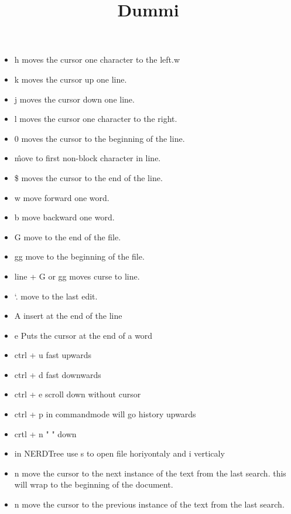 \documentclass[12pt]{article}
\title{Dummi}
\begin{document}
\setlength{\parindent}{0pt}
\setlength{\parskip}{30pt}
\setlength{\baselineskip}{20pt}




\begin{itemize}

    \item h moves the cursor one character to the left.w
    \item k moves the cursor up one line.
    \item j moves the cursor down one line.
    \item l moves the cursor one character to the right.
    \item 0 moves the cursor to the beginning of the line.
    \item \^ move to first non-block character in line. 
    \item \$ moves the cursor to the end of the line.
    \item w move forward one word.
    \item b move backward one word.
    \item G move to the end of the file.
    \item gg move to the beginning of the file.
    \item line + G or gg moves curse to line.
    \item `. move to the last edit.
    \item A insert at the end of the line
    \item e  Puts the cursor at the end of a word
    \item ctrl + u  fast upwards
    \item ctrl + d  fast downwards
    \item ctrl + e  scroll down without cursor
    \item ctrl + p in commandmode will go history upwards
    \item crtl + n "                            " down
    \item in NERDTree use s to open file horiyontaly and i verticaly
    \item n move the cursor to the next instance of the text from the last search. this will wrap to the beginning of the document.
    \item n move the cursor to the previous instance of the text from the last search.

\end{itemize}
\end{document}
